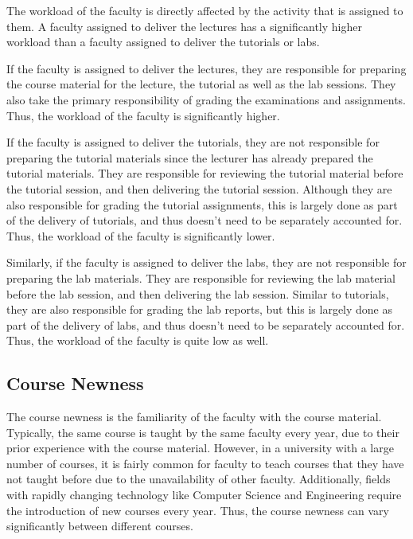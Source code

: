 The workload of the faculty is directly affected by the activity that is assigned to them. A faculty assigned to deliver the lectures has a significantly higher workload than a faculty assigned to deliver the tutorials or labs.

If the faculty is assigned to deliver the lectures, they are responsible for preparing the course material for the lecture, the tutorial as well as the lab sessions. They also take the primary responsibility of grading the examinations and assignments. Thus, the workload of the faculty is significantly higher.

If the faculty is assigned to deliver the tutorials, they are not responsible for preparing the tutorial materials since the lecturer has already prepared the tutorial materials. They are responsible for reviewing the tutorial material before the tutorial session, and then delivering the tutorial session. Although they are also responsible for grading the tutorial assignments, this is largely done as part of the delivery of tutorials, and thus doesn't need to be separately accounted for. Thus, the workload of the faculty is significantly lower.

Similarly, if the faculty is assigned to deliver the labs, they are not responsible for preparing the lab materials. They are responsible for reviewing the lab material before the lab session, and then delivering the lab session. Similar to tutorials, they are also responsible for grading the lab reports, but this is largely done as part of the delivery of labs, and thus doesn't need to be separately accounted for. Thus, the workload of the faculty is quite low as well.

\subsection{Course Newness}

The course newness is the familiarity of the faculty with the course material. Typically, the same course is taught by the same faculty every year, due to their prior experience with the course material. However, in a university with a large number of courses, it is fairly common for faculty to teach courses that they have not taught before due to the unavailability of other faculty. Additionally, fields with rapidly changing technology like Computer Science and Engineering require the introduction of new courses every year. Thus, the course newness can vary significantly between different courses.

